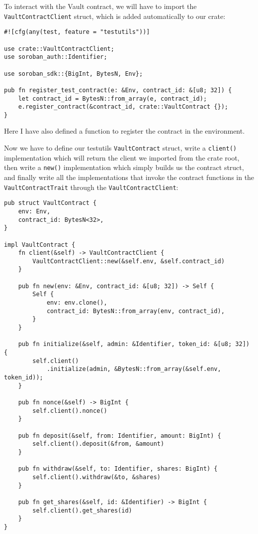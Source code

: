 \documentclass{article}
\newcommand{\inl}[1]{\lstinline{#1}}
\begin{document}
To interact with the Vault contract, we will have to import the \inl{VaultContractClient} struct, which is added automatically to our crate:

\begin{lstlisting}
#![cfg(any(test, feature = "testutils"))]

use crate::VaultContractClient;
use soroban_auth::Identifier;

use soroban_sdk::{BigInt, BytesN, Env};

pub fn register_test_contract(e: &Env, contract_id: &[u8; 32]) {
    let contract_id = BytesN::from_array(e, contract_id);
    e.register_contract(&contract_id, crate::VaultContract {});
}

\end{lstlisting}

Here I have also defined a function to register the contract in the environment.

Now we have to define our testutils \inl{VaultContract} struct, write a \inl{client()} implementation which will return the client we imported from the crate root, then write a \inl{new()} implementation which simply builds us the contract struct, and finally write all the implementations that invoke the contract functions in the \inl{VaultContractTrait} through the \inl{VaultContractClient}:

\begin{lstlisting}
pub struct VaultContract {
    env: Env,
    contract_id: BytesN<32>,
}

impl VaultContract {
    fn client(&self) -> VaultContractClient {
        VaultContractClient::new(&self.env, &self.contract_id)
    }

    pub fn new(env: &Env, contract_id: &[u8; 32]) -> Self {
        Self {
            env: env.clone(),
            contract_id: BytesN::from_array(env, contract_id),
        }
    }

    pub fn initialize(&self, admin: &Identifier, token_id: &[u8; 32]) {
        self.client()
            .initialize(admin, &BytesN::from_array(&self.env, token_id));
    }

    pub fn nonce(&self) -> BigInt {
        self.client().nonce()
    }

    pub fn deposit(&self, from: Identifier, amount: BigInt) {
        self.client().deposit(&from, &amount)
    }

    pub fn withdraw(&self, to: Identifier, shares: BigInt) {
        self.client().withdraw(&to, &shares)
    }

    pub fn get_shares(&self, id: &Identifier) -> BigInt {
        self.client().get_shares(id)
    }
}
\end{lstlisting}
\end{document}
